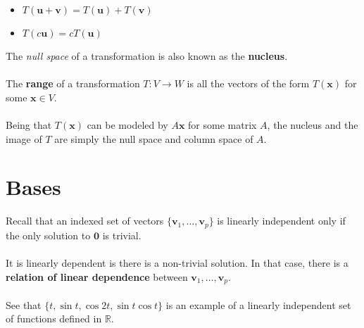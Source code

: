 \documentclass[12pt]{article}
\newcommand{\R}{\mathbb{R}}
\newcommand{\bt}[1]{\textbf{{#1}}}
\newcommand{\bm}[1]{\mathbf{{#1}}}
\begin{document}
\begin{itemize}
    \item $T(\bm{u + v}) = T(\bm{u}) + T(\bm{v})$
    \item $T(c\bm{u}) = cT(\bm{u})$
\end{itemize}

The \emph{null space} of a transformation is also known as the \bt{nucleus}. \\ \\

The \bt{range} of a transformation $T: V \rightarrow W$ is all the vectors of the form $T(\bm{x})$ for some $\bm{x} \in V$. \\ \\

Being that $T(\bm{x})$ can be modeled by $A\bm{x}$ for some matrix $A$, the nucleus and the image of $T$ are simply
the null space and column space of $A$.

\section*{Bases}

Recall that an indexed set of vectors $\{\bm{v}_1,\dots,\bm{v}_p\}$ is linearly independent only if the only solution to $\bm{0}$ is trivial. \\ \\

It is linearly dependent is there is a non-trivial solution. In that case, there is a \bt{relation of linear dependence} between $\bm{v}_1,\dots,\bm{v}_p$. \\ \\

See that $\{t, \sin t, \cos 2t, \sin t \cos t\}$ is an example of a linearly independent set of functions defined in $\R$.
\end{document}

